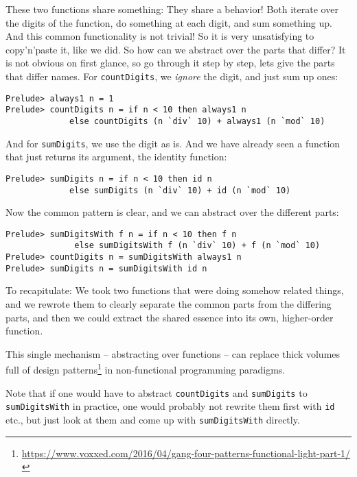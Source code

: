 \documentclass[11pt,
  american,
  DIV13]{article}
\DeclareRobustCommand{\href}[2]{#2\footnote{\url{#1}}}
\begin{document}
These two functions share something: They share a behavior! Both iterate
over the digits of the function, do something at each digit, and sum
something up. And this common functionality is not trivial! So it is
very unsatisfying to copy'n'paste it, like we did. So how can we
abstract over the parts that differ? It is not obvious on first glance,
so go through it step by step, lets give the parts that differ names.
For \texttt{countDigits}, we \emph{ignore} the digit, and just sum up
ones:

\begin{verbatim}
Prelude> always1 n = 1
Prelude> countDigits n = if n < 10 then always1 n 
             else countDigits (n `div` 10) + always1 (n `mod` 10)
\end{verbatim}

And for \texttt{sumDigits}, we use the digit as is. And we have already
seen a function that just returns its argument, the identity function:

\begin{verbatim}
Prelude> sumDigits n = if n < 10 then id n 
             else sumDigits (n `div` 10) + id (n `mod` 10)
\end{verbatim}

Now the common pattern is clear, and we can abstract over the different
parts:

\begin{verbatim}
Prelude> sumDigitsWith f n = if n < 10 then f n 
              else sumDigitsWith f (n `div` 10) + f (n `mod` 10)
Prelude> countDigits n = sumDigitsWith always1 n
Prelude> sumDigits n = sumDigitsWith id n
\end{verbatim}

To recapitulate: We took two functions that were doing somehow related
things, and we rewrote them to clearly separate the common parts from
the differing parts, and then we could extract the shared essence into
its own, higher-order function.

This single mechanism -- abstracting over functions -- can
\href{https://www.voxxed.com/2016/04/gang-four-patterns-functional-light-part-1/}{replace
thick volumes full of design patterns} in non-functional programming
paradigms.

Note that if one would have to abstract \texttt{countDigits} and
\texttt{sumDigits} to \texttt{sumDigitsWith} in practice, one would
probably not rewrite them first with \texttt{id} etc., but just look at
them and come up with \texttt{sumDigitsWith} directly.
\end{document}
